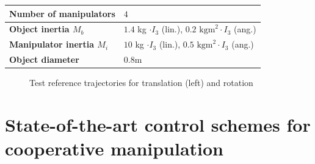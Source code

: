 \documentclass[a4paper,twoside, openright,12pt]{report}
\begin{document}
{\begin{table}[h]
	\begin{tabular}{ l | l}
		\textbf{Number of manipulators} & \textbf{$4$}\\ \hline
		\textbf{Object inertia $M_b$} & $1.4$ kg $\cdot I_3$ (lin.), $0.2 \text{ kgm}^2 \cdot I_3$ (ang.)\\ \hline
		\textbf{Manipulator inertia $M_i$} & $10$ kg $\cdot I_3$ (lin.), $0.5 \text{ kgm}^2 \cdot I_3$ (ang.) \\ \hline
		\textbf{Object diameter} & $0.8$m \\ \hline
	\end{tabular}
\end{table}
\begin{figure}[h]
\centering

\caption{Test reference trajectories for translation (left) and rotation}
\label{FIG:ReferenceTrajectory}
\end{figure}



\section{State-of-the-art control schemes for cooperative manipulation}



%








}
\end{document}
